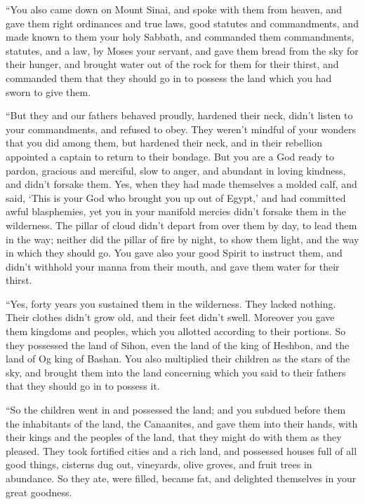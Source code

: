  ``You also came down on Mount Sinai, and spoke with them
from heaven, and gave them right ordinances and true laws, good statutes
and commandments,  and made known to them your holy
Sabbath, and commanded them commandments, statutes, and a law, by Moses
your servant,  and gave them bread from the sky for their
hunger, and brought water out of the rock for them for their thirst, and
commanded them that they should go in to possess the land which you had
sworn to give them.

 ``But they and our fathers behaved proudly, hardened
their neck, didn't listen to your commandments,  and
refused to obey. They weren't mindful of your wonders that you did among
them, but hardened their neck, and in their rebellion appointed a
captain to return to their bondage. But you are a God ready to pardon,
gracious and merciful, slow to anger, and abundant in loving kindness,
and didn't forsake them.  Yes, when they had made
themselves a molded calf, and said, `This is your God who brought you up
out of Egypt,' and had committed awful blasphemies,  yet
you in your manifold mercies didn't forsake them in the wilderness. The
pillar of cloud didn't depart from over them by day, to lead them in the
way; neither did the pillar of fire by night, to show them light, and
the way in which they should go.  You gave also your good
Spirit to instruct them, and didn't withhold your manna from their
mouth, and gave them water for their thirst.

 ``Yes, forty years you sustained them in the wilderness.
They lacked nothing. Their clothes didn't grow old, and their feet
didn't swell.  Moreover you gave them kingdoms and
peoples, which you allotted according to their portions. So they
possessed the land of Sihon, even the land of the king of Heshbon, and
the land of Og king of Bashan.  You also multiplied their
children as the stars of the sky, and brought them into the land
concerning which you said to their fathers that they should go in to
possess it.

 ``So the children went in and possessed the land; and
you subdued before them the inhabitants of the land, the Canaanites, and
gave them into their hands, with their kings and the peoples of the
land, that they might do with them as they pleased.  They
took fortified cities and a rich land, and possessed houses full of all
good things, cisterns dug out, vineyards, olive groves, and fruit trees
in abundance. So they ate, were filled, became fat, and delighted
themselves in your great goodness.

